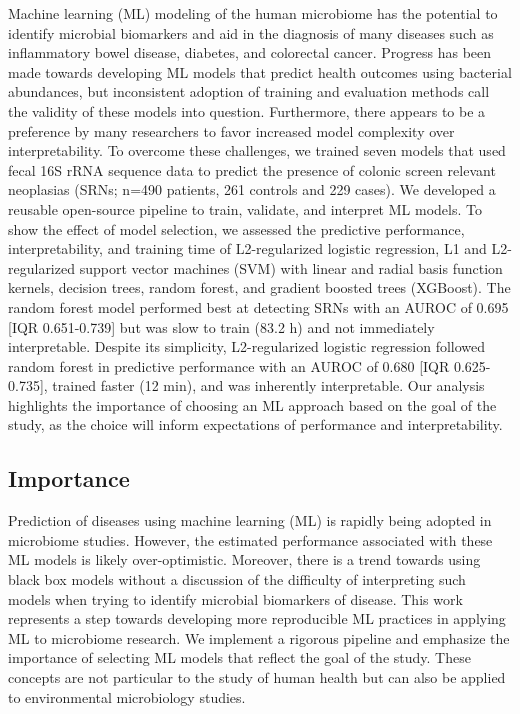 \documentclass[11pt,]{article}
\begin{document}
Machine learning (ML) modeling of the human microbiome has the potential
to identify microbial biomarkers and aid in the diagnosis of many
diseases such as inflammatory bowel disease, diabetes, and colorectal
cancer. Progress has been made towards developing ML models that predict
health outcomes using bacterial abundances, but inconsistent adoption of
training and evaluation methods call the validity of these models into
question. Furthermore, there appears to be a preference by many
researchers to favor increased model complexity over interpretability.
To overcome these challenges, we trained seven models that used fecal
16S rRNA sequence data to predict the presence of colonic screen
relevant neoplasias (SRNs; n=490 patients, 261 controls and 229 cases).
We developed a reusable open-source pipeline to train, validate, and
interpret ML models. To show the effect of model selection, we assessed
the predictive performance, interpretability, and training time of
L2-regularized logistic regression, L1 and L2-regularized support vector
machines (SVM) with linear and radial basis function kernels, decision
trees, random forest, and gradient boosted trees (XGBoost). The random
forest model performed best at detecting SRNs with an AUROC of 0.695
{[}IQR 0.651-0.739{]} but was slow to train (83.2 h) and not immediately
interpretable. Despite its simplicity, L2-regularized logistic
regression followed random forest in predictive performance with an
AUROC of 0.680 {[}IQR 0.625-0.735{]}, trained faster (12 min), and was
inherently interpretable. Our analysis highlights the importance of
choosing an ML approach based on the goal of the study, as the choice
will inform expectations of performance and interpretability.

\newpage

\subsection{Importance}\label{importance}

Prediction of diseases using machine learning (ML) is rapidly being
adopted in microbiome studies. However, the estimated performance
associated with these ML models is likely over-optimistic. Moreover,
there is a trend towards using black box models without a discussion of
the difficulty of interpreting such models when trying to identify
microbial biomarkers of disease. This work represents a step towards
developing more reproducible ML practices in applying ML to microbiome
research. We implement a rigorous pipeline and emphasize the importance
of selecting ML models that reflect the goal of the study. These
concepts are not particular to the study of human health but can also be
applied to environmental microbiology studies.
\end{document}
